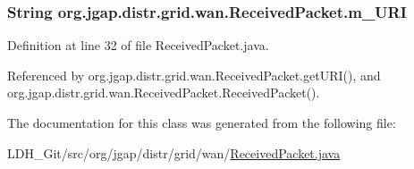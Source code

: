 \hypertarget{classorg_1_1jgap_1_1distr_1_1grid_1_1wan_1_1_received_packet_a9e6aceeae569c837c19163fa9bf07f98}{
\subsubsection[{m\-\_\-\-U\-R\-I}]{\setlength{\rightskip}{0pt plus 5cm}String org.\-jgap.\-distr.\-grid.\-wan.\-Received\-Packet.\-m\-\_\-\-U\-R\-I\hspace{0.3cm}{\ttfamily [private]}}}\label{classorg_1_1jgap_1_1distr_1_1grid_1_1wan_1_1_received_packet_a9e6aceeae569c837c19163fa9bf07f98}


Definition at line 32 of file Received\-Packet.\-java.



Referenced by org.\-jgap.\-distr.\-grid.\-wan.\-Received\-Packet.\-get\-U\-R\-I(), and org.\-jgap.\-distr.\-grid.\-wan.\-Received\-Packet.\-Received\-Packet().



The documentation for this class was generated from the following file\-:\begin{DoxyCompactItemize}
\item 
L\-D\-H\-\_\-\-Git/src/org/jgap/distr/grid/wan/\hyperlink{_received_packet_8java}{Received\-Packet.\-java}\end{DoxyCompactItemize}

